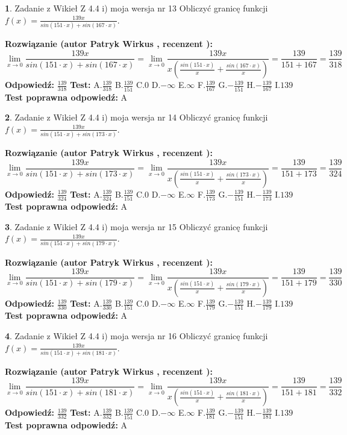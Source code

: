 \documentclass[12pt, a4paper]{article}
\theoremstyle{definition} %
\newtheorem{zad}{}
\newcommand{\zadStart}[1]{\begin{zad}#1\newline}
\newcommand{\zadStop}{\end{zad}}
\newcommand{\rozwStart}[2]{\noindent \textbf{Rozwiązanie (autor #1 , recenzent #2): }\newline}
\newcommand{\rozwStop}{\newline}
\newcommand{\odpStart}{\noindent \textbf{Odpowiedź:}\newline}
\newcommand{\odpStop}{\newline}
\newcommand{\testStart}{\noindent \textbf{Test:}\newline}
\newcommand{\testStop}{\newline}
\newcommand{\kluczStart}{\noindent \textbf{Test poprawna odpowiedź:}\newline}
\newcommand{\kluczStop}{\newline}
\begin{document}
\zadStart{Zadanie z Wikieł Z 4.4 i) moja wersja nr 13}
Obliczyć granicę funkcji $f(x)=\frac{139x}{sin(151\cdot x) +sin(167\cdot x)}$.
\zadStop
\rozwStart{Patryk Wirkus}{}
$$\lim\limits_{x\to 0}\frac{139x}{sin(151\cdot x) +sin(167\cdot x)}=\lim\limits_{x\to 0}\frac{139x}{x(\frac{sin(151\cdot x)}{x}+\frac{sin(167\cdot x)}{x})}=\frac{139}{151+167} = \frac{139}{318}$$
\rozwStop
\odpStart
$\frac{139}{318}$
\odpStop
\testStart
A.$\frac{139}{318}$
B.$\frac{139}{151}$
C.$0$
D.$-\infty$
E.$\infty$
F.$\frac{139}{167}$
G.$-\frac{139}{151}$
H.$-\frac{139}{167}$
I.$139$
\testStop
\kluczStart
A
\kluczStop



\zadStart{Zadanie z Wikieł Z 4.4 i) moja wersja nr 14}
Obliczyć granicę funkcji $f(x)=\frac{139x}{sin(151\cdot x) +sin(173\cdot x)}$.
\zadStop
\rozwStart{Patryk Wirkus}{}
$$\lim\limits_{x\to 0}\frac{139x}{sin(151\cdot x) +sin(173\cdot x)}=\lim\limits_{x\to 0}\frac{139x}{x(\frac{sin(151\cdot x)}{x}+\frac{sin(173\cdot x)}{x})}=\frac{139}{151+173} = \frac{139}{324}$$
\rozwStop
\odpStart
$\frac{139}{324}$
\odpStop
\testStart
A.$\frac{139}{324}$
B.$\frac{139}{151}$
C.$0$
D.$-\infty$
E.$\infty$
F.$\frac{139}{173}$
G.$-\frac{139}{151}$
H.$-\frac{139}{173}$
I.$139$
\testStop
\kluczStart
A
\kluczStop



\zadStart{Zadanie z Wikieł Z 4.4 i) moja wersja nr 15}
Obliczyć granicę funkcji $f(x)=\frac{139x}{sin(151\cdot x) +sin(179\cdot x)}$.
\zadStop
\rozwStart{Patryk Wirkus}{}
$$\lim\limits_{x\to 0}\frac{139x}{sin(151\cdot x) +sin(179\cdot x)}=\lim\limits_{x\to 0}\frac{139x}{x(\frac{sin(151\cdot x)}{x}+\frac{sin(179\cdot x)}{x})}=\frac{139}{151+179} = \frac{139}{330}$$
\rozwStop
\odpStart
$\frac{139}{330}$
\odpStop
\testStart
A.$\frac{139}{330}$
B.$\frac{139}{151}$
C.$0$
D.$-\infty$
E.$\infty$
F.$\frac{139}{179}$
G.$-\frac{139}{151}$
H.$-\frac{139}{179}$
I.$139$
\testStop
\kluczStart
A
\kluczStop



\zadStart{Zadanie z Wikieł Z 4.4 i) moja wersja nr 16}
Obliczyć granicę funkcji $f(x)=\frac{139x}{sin(151\cdot x) +sin(181\cdot x)}$.
\zadStop
\rozwStart{Patryk Wirkus}{}
$$\lim\limits_{x\to 0}\frac{139x}{sin(151\cdot x) +sin(181\cdot x)}=\lim\limits_{x\to 0}\frac{139x}{x(\frac{sin(151\cdot x)}{x}+\frac{sin(181\cdot x)}{x})}=\frac{139}{151+181} = \frac{139}{332}$$
\rozwStop
\odpStart
$\frac{139}{332}$
\odpStop
\testStart
A.$\frac{139}{332}$
B.$\frac{139}{151}$
C.$0$
D.$-\infty$
E.$\infty$
F.$\frac{139}{181}$
G.$-\frac{139}{151}$
H.$-\frac{139}{181}$
I.$139$
\testStop
\kluczStart
A
\kluczStop
\end{document}

